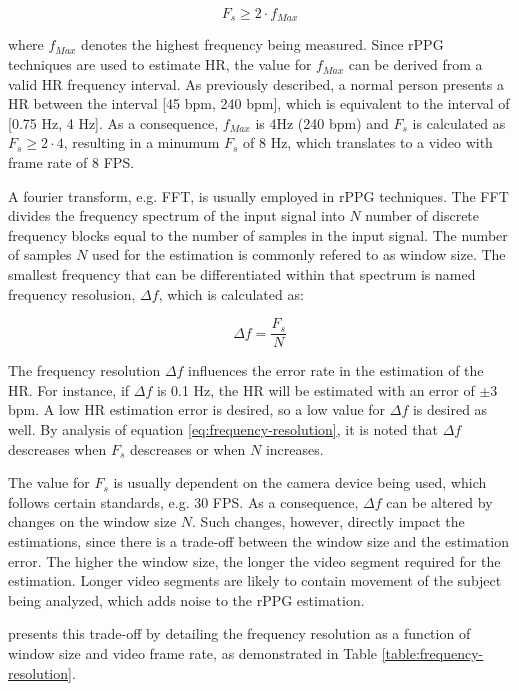 \begin{equation*}
    F_s \geq 2 \cdot f_{Max}
\end{equation*}

where $f_{Max}$ denotes the highest frequency being measured. Since rPPG techniques are used to estimate HR, the value for $f_{Max}$ can be derived from a valid HR frequency interval. As previously described, a normal person presents a HR between the interval [45 bpm, 240 bpm], which is equivalent to the interval of [0.75 Hz, 4 Hz]. As a consequence, $f_{Max}$ is 4Hz (240 bpm) and $F_s$ is calculated as $F_s \geq 2 \cdot 4$, resulting in a minumum $F_s$ of 8 Hz, which translates to a video with frame rate of 8 FPS.

A fourier transform, e.g. FFT, is usually employed in rPPG techniques. The FFT divides the frequency spectrum of the input signal into $N$ number of discrete frequency blocks equal to the number of samples in the input signal. The number of samples $N$ used for the estimation is commonly refered to as window size. The smallest frequency that can be differentiated within that spectrum is named frequency resolusion, $\Delta f$, which is calculated as:

\begin{equation}
    \Delta f = \frac{F_s}{N}
    \label{eq:frequency-resolution}
\end{equation}

The frequency resolution $\Delta f$ influences the error rate in the estimation of the HR. For instance, if $\Delta f$ is 0.1 Hz, the HR will be estimated with an error of $\pm 3$ bpm. A low HR estimation error is desired, so a low value for $\Delta f$ is desired as well. By analysis of equation \ref{eq:frequency-resolution}, it is noted that $\Delta f$ descreases when $F_s$ descreases or when $N$ increases.

The value for $F_s$ is usually dependent on the camera device being used, which follows certain standards, e.g. 30 FPS. As a consequence, $\Delta f$ can be altered by changes on the window size $N$. Such changes, however, directly impact the estimations, since there is a trade-off between the window size and the estimation error. The higher the window size, the longer the video segment required for the estimation. Longer video segments are likely to contain movement of the subject being analyzed, which adds noise to the rPPG estimation.

\textcite{roald2013estimation} presents this trade-off by detailing the frequency resolution as a function of window size and video frame rate, as demonstrated in Table \ref{table:frequency-resolution}.

